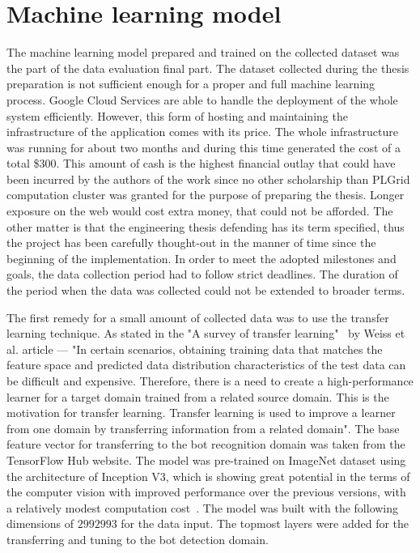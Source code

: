 \section{Machine learning model}\label{sec:machine-learning-model}
The machine learning model prepared and trained on the collected dataset was the part of the data evaluation final part.
The dataset collected during the thesis preparation is not sufficient enough for a proper and full machine learning process.
Google Cloud Services are able to handle the deployment of the whole system efficiently.
However, this form of hosting and maintaining the infrastructure of the application comes with its price.
The whole infrastructure was running for about two months and during this time generated the cost of a total \$300.
This amount of cash is the highest financial outlay that could have been incurred by the authors of the work since no other scholarship than PLGrid computation cluster was granted for the purpose of preparing the thesis.
Longer exposure on the web would cost extra money, that could not be afforded.
The other matter is that the engineering thesis defending has its term specified, thus the project has been carefully thought-out in the manner of time since the beginning of the implementation.
In order to meet the adopted milestones and goals, the data collection period had to follow strict deadlines.
The duration of the period when the data was collected could not be extended to broader terms.

The first remedy for a small amount of collected data was to use the transfer learning technique.
As stated in the "A survey of transfer learning"~\cite{transfer-learning-def} by Weiss et al. article --- "In certain scenarios, obtaining training data that matches the feature space and predicted data distribution characteristics of the test data can be difficult and expensive.
Therefore, there is a need to create a high-performance learner for a target domain trained from a related source domain.
This is the motivation for transfer learning.
Transfer learning is used to improve a learner from one domain by transferring information from a related domain".
The base feature vector for transferring to the bot recognition domain was taken from the TensorFlow Hub website.
The model was pre-trained on ImageNet dataset using the architecture of Inception V3, which is showing great potential in the terms of the computer vision with improved performance over the previous versions, with a relatively modest computation cost~\cite{inception-v3}.
The model was built with the following dimensions of $299$\texttimes$299$\texttimes$3$ for the data input.
The topmost layers were added for the transferring and tuning to the bot detection domain.

